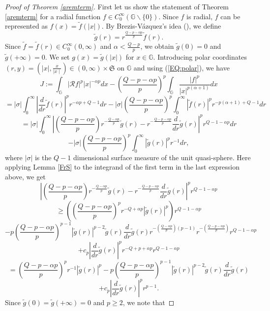 \documentclass[a4paper,12pt,reqno]{amsart}
\renewcommand\eqref[1]{(\ref{#1})} %
\numberwithin{equation}{section}
\theoremstyle{plain}
\theoremstyle{definition}
\renewcommand{\wp}{\mathfrak S}
\begin{document}
\begin{proof}[Proof of Theorem \ref{aremterm}] First let us show the statement of Theorem \ref{aremterm} for a radial function $f\in C_{0}^{\infty}(\mathbb{G}\backslash\{0\})$. Since $f$ is radial, $f$ can be represented as $f(x)=\widetilde{f}(|x|)$. By Brezis-V\'{a}zquez's idea (\cite{BV97}), we define
\begin{equation}\label{aremterm2}
\widetilde{g}(r)=r^{\frac{Q-p-\alpha p}{p}}\widetilde{f}(r).
\end{equation}
Since $\widetilde{f}=\widetilde{f}(r)\in C_{0}^{\infty}(0,\infty)$ and $\alpha<\frac{Q-p}{p}$, we obtain $\widetilde{g}(0)=0$ and $\widetilde{g}(+\infty)=0$. We set $g(x)=\widetilde{g}(|x|)$ for $x\in \mathbb{G}$.
Introducing polar coordinates $(r,y)=(|x|, \frac{x}{\mid x\mid})\in (0,\infty)\times\wp$ on $\mathbb{G}$ and using \eqref{EQ:polar}, we have
$$J:=\int_{\mathbb{G}}|\mathcal{R}f|^{p}|x|^{-\alpha p}dx-\left(\frac{Q-p-\alpha p}{p}\right)^{p}\int_{\mathbb{G}}\frac{|f|^{p}}{|x|^{p(\alpha+1)}}dx$$
$$=|\sigma|\int_{0}^{\infty}\left|\frac{d}{dr}\widetilde{f}(r)\right|^{p}r^{-\alpha p+Q-1}dr-|\sigma|
\left(\frac{Q-p-\alpha p}{p}\right)^{p}\int_{0}^{\infty}|\widetilde{f}(r)|^{p}r^{-p(\alpha+1)+Q-1}dr$$
$$=|\sigma|\int_{0}^{\infty}\left|\left(\frac{Q-p-\alpha p}{p}\right)r^{-\frac{Q-\alpha p}{p}}\widetilde{g}(r)
-r^{-\frac{Q-p-\alpha p}{p}}\frac{d}{dr}\widetilde{g}(r)\right|^{p}r^{Q-1-\alpha p}dr$$
$$-|\sigma|\left(\frac{Q-p-\alpha p}{p}\right)^{p}\int_{0}^{\infty}|\widetilde{g}(r)|^{p}r^{-1}dr,$$
where $|\sigma|$ is the $Q-1$ dimensional surface measure of the unit quasi-sphere.
Here applying Lemma \ref{FrS} to the integrand of the first term in the last expression above, we get
$$\left|\left(\frac{Q-p-\alpha p}{p}\right)r^{-\frac{Q-\alpha p}{p}}\widetilde{g}(r)-r^{-\frac{Q-p-\alpha p}{p}}\frac{d}{dr}\widetilde{g}(r)\right|^{p}r^{Q-1-\alpha p}$$
$$\geq\left(\left(\frac{Q-p-\alpha p}{p}\right)^{p}r^{-Q+\alpha p}|\widetilde{g}(r)|^{p}\right)r^{Q-1-\alpha p}$$
$$-p\left(\frac{Q-p-\alpha p}{p}\right)^{p-1}|\widetilde{g}(r)|^{p-2}\widetilde{g}(r)\frac{d}{dr}\widetilde{g}(r)
r^{-(\frac{Q-\alpha p}{p})(p-1)}r^{-(\frac{Q-p-\alpha p}{p})}r^{Q-1-\alpha p}$$
$$+c_{p}\left|\frac{d}{dr}\widetilde{g}(r)\right|^{p}r^{-Q+p+\alpha p}r^{Q-1-\alpha p}$$
$$=\left(\frac{Q-p-\alpha p}{p}\right)^{p}r^{-1}|\widetilde{g}(r)|^{p}-p\left(\frac{Q-p-\alpha p}{p}\right)^{p-1}|\widetilde{g}(r)|^{p-2}\widetilde{g}(r)\frac{d}{dr}\widetilde{g}(r)$$
$$+c_{p}\left|\frac{d}{dr}\widetilde{g}(r)\right|^{p}r^{p-1}.$$
Since $\widetilde{g}(0)=\widetilde{g}(+\infty)=0$ and $p\geq2$, we note that

\end{proof}
\end{document}
